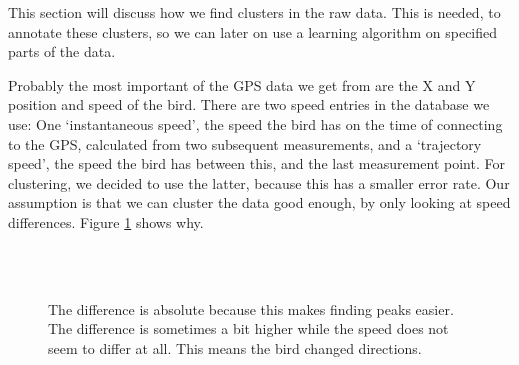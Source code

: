  This section will discuss how we find clusters in the raw data. 
 This is needed, to annotate these clusters, so we can later on use a
 learning algorithm on specified parts of the data.

     Probably the most important of the GPS data we get from \bits are the X and Y
     position and speed of the bird. There are two speed entries in the database we
     use: One `instantaneous speed', the speed the bird has on the time of
     connecting to the GPS, calculated from two subsequent measurements, and a
     `trajectory speed', the speed the bird has between this, and the last
     measurement point. For clustering, we decided to use the latter, because this
     has a smaller error rate. Our assumption is that we can cluster the data good
     enough, by only looking at speed differences. Figure \ref{fig:speed} shows
     why.

\begin{figure}
  \centering
   \\
   \\
  \caption{The difference is absolute because this makes finding peaks easier. The difference is sometimes a bit higher while the speed does not seem to differ at all. This means the bird changed directions.}
  \label{fig:speed}
\end{figure}

